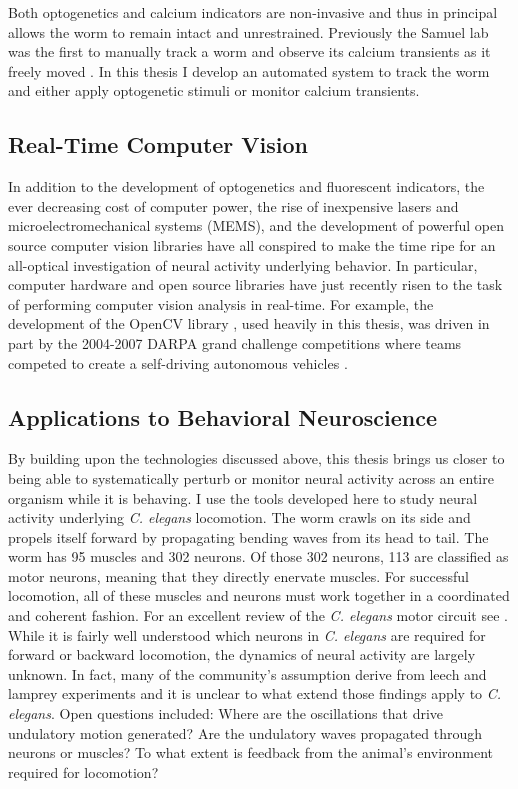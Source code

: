 Both optogenetics and calcium indicators are non-invasive and thus in principal allows the worm to remain intact and unrestrained. Previously the Samuel lab was the first to manually track a worm and observe its calcium transients as it freely moved \citep{clark_temporal_2007}. In this thesis I develop an automated system to track the worm and either apply optogenetic stimuli or monitor calcium transients.



\subsection{Real-Time Computer Vision}
In addition to the development of optogenetics and fluorescent indicators, the ever decreasing cost of computer power, the rise of inexpensive lasers and microelectromechanical systems (MEMS), and the development of powerful open source computer vision libraries have  all conspired to make the time ripe for an all-optical investigation of neural activity underlying behavior. In particular, computer hardware and open source libraries have just recently risen to the task of performing computer vision analysis in real-time. For example, the development of the OpenCV library \citep{bradski_opencv_2000,bradski_learning_2008}, used heavily in this thesis, was driven in part by the 2004-2007 DARPA grand challenge competitions where teams competed to create a self-driving autonomous vehicles \citep{stavens_learning_2011,buehler_stanley:_2007}.



\subsection{Applications to Behavioral Neuroscience}

By building upon the technologies discussed above, this thesis brings us closer to being able to systematically perturb or monitor neural activity across an entire organism while it is behaving. I use the tools developed here to study  neural activity underlying \emph{C. elegans} locomotion. The worm crawls on its side and propels itself forward by propagating bending waves from its head to tail.  The worm has 95 muscles and 302 neurons. Of those 302 neurons, 113 are classified as motor neurons, meaning that they directly enervate muscles. For successful locomotion, all of these muscles and neurons must work together in a coordinated and coherent fashion. For an excellent review of the \textit{C. elegans}  motor circuit see \citep{von_stetina_motor_2006}. While it is fairly well understood which neurons  in \textit{C. elegans} are required for forward or backward locomotion, the dynamics of neural activity are largely unknown. In fact, many of the community's assumption derive from leech and lamprey experiments \citep{friesen_sensory_2001, karbowski_systems_2008} and it is unclear to what extend those findings apply to \textit{C. elegans}. Open questions included: Where are the oscillations that drive undulatory motion generated? Are the undulatory waves propagated through neurons or muscles? To what extent is  feedback from the animal's environment required for locomotion? 

